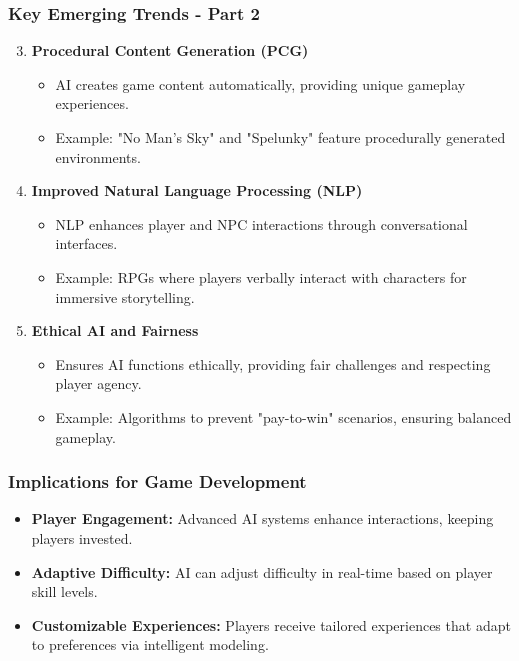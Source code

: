 \documentclass[aspectratio=169]{beamer}
\begin{document}
\begin{frame}[fragile]
    \frametitle{Key Emerging Trends - Part 2}
    \begin{enumerate}
        \setcounter{enumi}{2} %
        \item \textbf{Procedural Content Generation (PCG)}
            \begin{itemize}
                \item AI creates game content automatically, providing unique gameplay experiences.
                \item Example: "No Man's Sky" and "Spelunky" feature procedurally generated environments.
            \end{itemize}

        \item \textbf{Improved Natural Language Processing (NLP)}
            \begin{itemize}
                \item NLP enhances player and NPC interactions through conversational interfaces.
                \item Example: RPGs where players verbally interact with characters for immersive storytelling.
            \end{itemize}

        \item \textbf{Ethical AI and Fairness}
            \begin{itemize}
                \item Ensures AI functions ethically, providing fair challenges and respecting player agency.
                \item Example: Algorithms to prevent "pay-to-win" scenarios, ensuring balanced gameplay.
            \end{itemize}
    \end{enumerate}
\end{frame}

\begin{frame}[fragile]
    \frametitle{Implications for Game Development}
    \begin{itemize}
        \item \textbf{Player Engagement:} Advanced AI systems enhance interactions, keeping players invested.
        \item \textbf{Adaptive Difficulty:} AI can adjust difficulty in real-time based on player skill levels.
        \item \textbf{Customizable Experiences:} Players receive tailored experiences that adapt to preferences via intelligent modeling.
    \end{itemize}
\end{frame}
\end{document}
